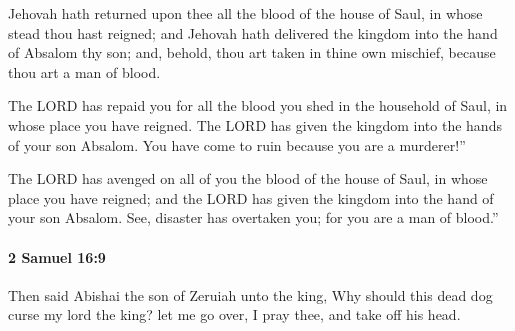 			\begin{versebox}
					\item[BHS] 
					\item[ASV] Jehovah hath returned upon thee all the blood of the house of Saul, in whose stead thou hast reigned; and Jehovah hath delivered the kingdom into the hand of Absalom thy son; and, behold, thou art taken in thine own mischief, because thou art a man of blood.
					\item[NIV] The LORD has repaid you for all the blood you shed in the household of Saul, in whose place you have reigned. The LORD has given the kingdom into the hands of your son Absalom. You have come to ruin because you are a murderer!”
					\item[NRSV] The LORD has avenged on all of you the blood of the house of Saul, in whose place you have reigned; and the LORD has given the kingdom into the hand of your son Absalom. See, disaster has overtaken you; for you are a man of blood.”
			\end{versebox}

		\paragraph{2 Samuel 16:9} %
			\label{2SAMUEL-16-9}

			Then said Abishai the son of Zeruiah unto the king, Why should this dead dog curse my lord the king? let me go over, I pray thee, and take off his head.


